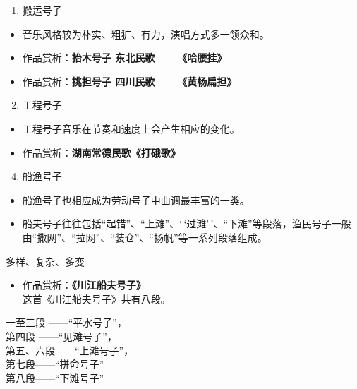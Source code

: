 \documentclass[
]{article}
\providecommand{\tightlist}{%
  \setlength{\itemsep}{0pt}\setlength{\parskip}{0pt}}
\begin{document}
\begin{enumerate}
\tightlist
\item
  搬运号子
\end{enumerate}

\begin{itemize}
\tightlist
\item
  音乐风格较为朴实、粗犷、有力，演唱方式多一领众和。
\item
  作品赏析：\textbf{抬木号子 东北民歌------《哈腰挂》}
\item
  作品赏析：\textbf{挑担号子 四川民歌------《黄杨扁担》}
\end{itemize}

\begin{enumerate}
\setcounter{enumi}{1}
\tightlist
\item
  工程号子
\end{enumerate}

\begin{itemize}
\tightlist
\item
  工程号子音乐在节奏和速度上会产生相应的变化。
\item
  作品赏析：\textbf{湖南常德民歌《打硪歌》}
\end{itemize}

\begin{enumerate}
\setcounter{enumi}{3}
\tightlist
\item
  船渔号子
\end{enumerate}

\begin{itemize}
\tightlist
\item
  船渔号子也相应成为劳动号子中曲调最丰富的一类。
\item
  船夫号子往往包括``起错''、``上滩''、`\,`过滩'\,'、``下滩''等段落，渔民号子一般由``撒网''、``拉网''、``装仓''、``扬帆''等一系列段落组成。
\end{itemize}

多样、复杂、多变

\begin{itemize}
\tightlist
\item
  作品赏析：\textbf{《川江船夫号子》}\\
  这首《川江船夫号子》共有八段。
\end{itemize}

一至三段 ------``平水号子''，\\
第四段 ------``见滩号子''，\\
第五、六段------``上滩号子''，\\
第七段------``拼命号子''\\
第八段------``下滩号子''
\end{document}
